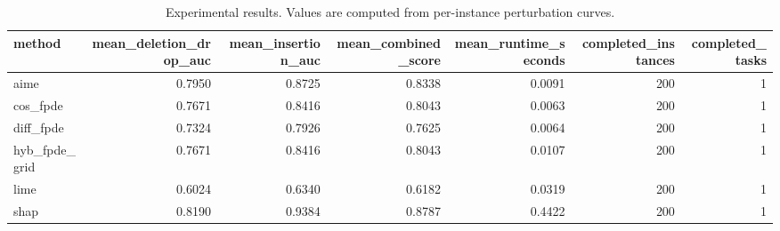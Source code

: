 \begin{table}[t]
\caption{Experimental results. Values are computed from per-instance perturbation curves.}
\label{tab:main_results_computed}
\centering
\begin{tabular}{lrrrrrr}
\toprule
method & mean\_deletion\_drop\_auc & mean\_insertion\_auc & mean\_combined\_score & mean\_runtime\_seconds & completed\_instances & completed\_tasks \\
\midrule
aime & 0.7950 & 0.8725 & 0.8338 & 0.0091 & 200 & 1 \\
cos\_fpde & 0.7671 & 0.8416 & 0.8043 & 0.0063 & 200 & 1 \\
diff\_fpde & 0.7324 & 0.7926 & 0.7625 & 0.0064 & 200 & 1 \\
hyb\_fpde\_grid & 0.7671 & 0.8416 & 0.8043 & 0.0107 & 200 & 1 \\
lime & 0.6024 & 0.6340 & 0.6182 & 0.0319 & 200 & 1 \\
shap & 0.8190 & 0.9384 & 0.8787 & 0.4422 & 200 & 1 \\
\bottomrule
\end{tabular}

\end{table}
